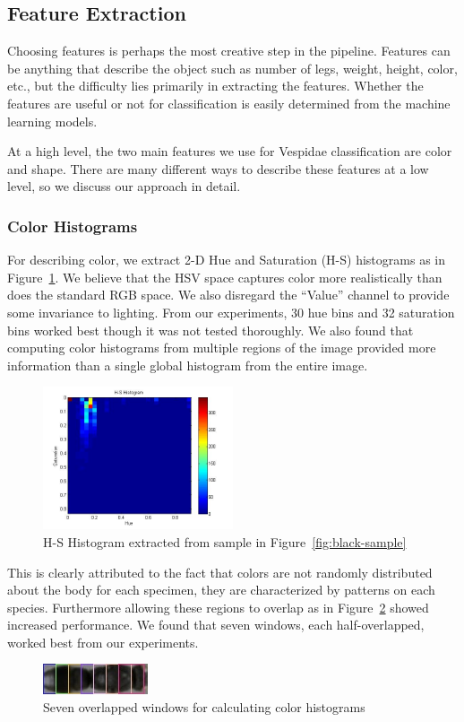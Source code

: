\documentclass[a4paper,12pt]{article}
\begin{document}
\subsection{Feature Extraction}
Choosing features is perhaps the most creative step in the pipeline. Features can be anything that describe the object such as number of legs, weight, height, color, etc., but the difficulty lies primarily in extracting the features. Whether the features are useful or not for classification is easily determined from the machine learning models.

At a high level, the two main features we use for Vespidae classification are color and shape. There are many different ways to describe these features at a low level, so we discuss our approach in detail.

\subsubsection{Color Histograms}
For describing color, we extract 2-D Hue and Saturation (H-S) histograms as in Figure~\ref{fig:HS-histogram}. We believe that the HSV space captures color more realistically than does the standard RGB space. We also disregard the ``Value'' channel to provide some invariance to lighting. From our experiments, 30 hue bins and 32 saturation bins worked best though it was not tested thoroughly. We also found that computing color histograms from multiple regions of the image provided more information than a single global histogram from the entire image. 
\begin{figure}
	\vspace{-10pt}
	\centering
	\includegraphics[width=0.5\textwidth]{hs/hs-ex}
	\caption{H-S Histogram extracted from sample in Figure~\ref{fig:black-sample}}
	\label{fig:HS-histogram}
\end{figure}
This is clearly attributed to the fact that colors are not randomly distributed about the body for each specimen, they are characterized by patterns on each species. Furthermore allowing these regions to overlap as in Figure~\ref{fig:overlap-color} showed increased performance. We found that seven windows, each half-overlapped, worked best from our experiments.
\begin{figure}
	\vspace{-10pt}
	\includegraphics[width=.25\textwidth]{hs/wind}
	\caption{Seven overlapped windows for calculating color histograms}
	\label{fig:overlap-color}
\end{figure}
\end{document}
